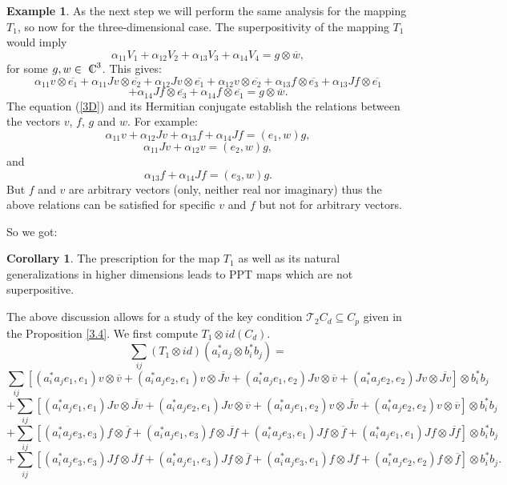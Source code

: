 \documentclass{amsart}
\theoremstyle{plain}
\theoremstyle{definition}
\newtheorem{exmp}[thm]{Example}
\newtheorem{cor}[thm]{Corollary}
\newcommand{\cT}{\mathcal{T}}
\newcommand{\Cn}{{\setbox0=\hbox{
$\displaystyle\rm C$}\hbox{\hbox
to0pt{\kern0.6\wd0\vrule height0.9\ht0\hss}\box0}}} %
\begin{document}
\begin{exmp}
As the next step we will perform the same analysis for the mapping $T_1$, so now for the three-dimensional case. The superpositivity of the mapping $T_1$ would imply
\begin{equation}
\alpha_{11} V_1 + \alpha_{12}V_2 + \alpha_{13}V_3 + \alpha_{14} V_4 =   g\otimes \overline{w},
\end{equation}
for some $g,w \in \Cn^3$. This gives:
\begin{equation}
\label{3D}
\alpha_{11} v \otimes \overline{e_1} + \alpha_{11} J v \otimes \overline{e_2} + \alpha_{12} Jv\otimes \overline{e_1} +\alpha_{12} v \otimes \overline{e_2} + \alpha_{13} f\otimes \overline{e_3} + \alpha_{13} Jf\otimes \overline{e_1} 
\end{equation}
$$ + \alpha_{14} Jf\otimes \overline{e_3} + \alpha_{14} f\otimes \overline{e_1} = g\otimes \overline{w} .$$
The equation (\ref{3D}) and its Hermitian conjugate establish the relations between the vectors $v$, $f$, $g$ and $w$. For example:
\begin{equation}
\alpha_{11} v + \alpha_{12} Jv + \alpha_{13}f +\alpha_{14}Jf = (e_1,w)g,
\end{equation}
\begin{equation}
\alpha_{11}Jv + \alpha_{12} v = (e_2,w)g,
\end{equation}
and
\begin{equation}
\alpha_{13}f + \alpha_{14}Jf = (e_3,w)g.
\end{equation}
But $f$ and $v$ are arbitrary vectors  (only, neither real nor imaginary) thus the above relations can be satisfied for specific $v$ and $f$ but not for arbitrary vectors.
\end{exmp}

So we got:
\begin{cor}
The prescription for the map $T_1$ as well as its natural generalizations in higher dimensions leads to PPT maps which are not superpositive.
\end{cor}

The above discussion allows for a study of the key condition  $\cT_2 C_d \subseteq C_p$ given in the Proposition \ref{3.4}.
We first compute $T_1 \otimes id (C_d)$.
\begin{equation}
\sum_{ij}(T_1\otimes id)(a^*_ia_j\otimes b^*_ib_j) =
\end{equation}
$$\sum_{ij}[(a^*_ia_je_1,e_1) v\otimes \overline{v} + (a^*_ia_je_2,e_1) v\otimes \overline{Jv} +(a^*_ia_j e_1,e_2) Jv\otimes \overline{v} +(a^*_ia_j e_2,e_2) Jv\otimes \overline{Jv}] \otimes b^*_ib_j$$
$$+ \sum_{ij}[(a^*_ia_je_1,e_1) Jv\otimes \overline{Jv} + (a^*_ia_je_2,e_1) Jv\otimes \overline{v} +(a^*_ia_j e_1,e_2) v\otimes \overline{Jv} +(a^*_ia_j e_2,e_2) v\otimes \overline{v}] \otimes b^*_ib_j$$
$$+\sum_{ij}[(a^*_ia_je_3,e_3) f\otimes \overline{f} + (a^*_ia_je_1,e_3) f\otimes \overline{Jf} +(a^*_ia_j e_3,e_1) Jf\otimes \overline{f} +(a^*_ia_j e_1,e_1) Jf\otimes \overline{Jf}] \otimes b^*_ib_j$$
$$+\sum_{ij}[(a^*_ia_je_3,e_3) Jf\otimes \overline{Jf} + (a^*_ia_je_1,e_3) Jf\otimes \overline{f} +(a^*_ia_j e_3,e_1) f\otimes \overline{Jf} +(a^*_ia_j e_2,e_2) f\otimes \overline{f}] \otimes b^*_ib_j.$$
\end{document}
